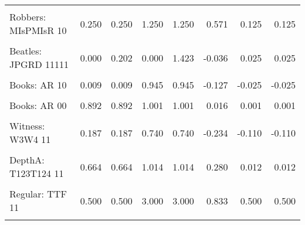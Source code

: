 \documentclass[10pt,]{scrartcl}
\begin{document}
\begin{table}[H]
{\begin{tabular}{lrrrrrrr}
\cellcolor{gray!6}{Robbers: MIsPMIsR 11} & \cellcolor{gray!6}{0.600} & \cellcolor{gray!6}{0.600} & \cellcolor{gray!6}{0.937} & \cellcolor{gray!6}{0.937} & \cellcolor{gray!6}{-0.143} & \cellcolor{gray!6}{-0.050} & \cellcolor{gray!6}{-0.050}\\
Robbers: MIsPMIsR 10 & 0.250 & 0.250 & 1.250 & 1.250 & 0.571 & 0.125 & 0.125\\
\cellcolor{gray!6}{Robbers: MIsPMIsR 01} & \cellcolor{gray!6}{0.250} & \cellcolor{gray!6}{0.250} & \cellcolor{gray!6}{1.250} & \cellcolor{gray!6}{1.250} & \cellcolor{gray!6}{0.571} & \cellcolor{gray!6}{0.125} & \cellcolor{gray!6}{0.125}\\
Beatles: JPGRD 11111 & 0.000 & 0.202 & 0.000 & 1.423 & -0.036 & 0.025 & 0.025\\
\cellcolor{gray!6}{Books: AR 11} & \cellcolor{gray!6}{0.014} & \cellcolor{gray!6}{0.014} & \cellcolor{gray!6}{1.493} & \cellcolor{gray!6}{1.493} & \cellcolor{gray!6}{0.212} & \cellcolor{gray!6}{0.027} & \cellcolor{gray!6}{0.027}\\
Books: AR 10 & 0.009 & 0.009 & 0.945 & 0.945 & -0.127 & -0.025 & -0.025\\
\cellcolor{gray!6}{Books: AR 01} & \cellcolor{gray!6}{0.100} & \cellcolor{gray!6}{0.100} & \cellcolor{gray!6}{0.995} & \cellcolor{gray!6}{0.995} & \cellcolor{gray!6}{-0.101} & \cellcolor{gray!6}{-0.003} & \cellcolor{gray!6}{-0.003}\\
Books: AR 00 & 0.892 & 0.892 & 1.001 & 1.001 & 0.016 & 0.001 & 0.001\\
\cellcolor{gray!6}{Witness: W1W2 11} & \cellcolor{gray!6}{0.451} & \cellcolor{gray!6}{0.451} & \cellcolor{gray!6}{3.551} & \cellcolor{gray!6}{3.551} & \cellcolor{gray!6}{0.771} & \cellcolor{gray!6}{0.446} & \cellcolor{gray!6}{0.446}\\
Witness: W3W4 11 & 0.187 & 0.187 & 0.740 & 0.740 & -0.234 & -0.110 & -0.110\\
\cellcolor{gray!6}{Witness: W4W5 11} & \cellcolor{gray!6}{0.365} & \cellcolor{gray!6}{0.365} & \cellcolor{gray!6}{1.260} & \cellcolor{gray!6}{1.260} & \cellcolor{gray!6}{0.218} & \cellcolor{gray!6}{0.110} & \cellcolor{gray!6}{0.110}\\
DepthA: T123T124 11 & 0.664 & 0.664 & 1.014 & 1.014 & 0.280 & 0.012 & 0.012\\
\cellcolor{gray!6}{DepthB: T123T145 11} & \cellcolor{gray!6}{0.331} & \cellcolor{gray!6}{0.331} & \cellcolor{gray!6}{0.996} & \cellcolor{gray!6}{0.996} & \cellcolor{gray!6}{-0.047} & \cellcolor{gray!6}{-0.003} & \cellcolor{gray!6}{-0.003}\\
Regular: TTF 11 & 0.500 & 0.500 & 3.000 & 3.000 & 0.833 & 0.500 & 0.500\\
\cellcolor{gray!6}{Dodecahedron: TTF 11} & \cellcolor{gray!6}{0.500} & \cellcolor{gray!6}{0.500} & \cellcolor{gray!6}{6.000} & \cellcolor{gray!6}{6.000} & \cellcolor{gray!6}{0.917} & \cellcolor{gray!6}{0.625} & \cellcolor{gray!6}{0.625}\\
\bottomrule
\end{tabular}}
\end{table}
\end{document}
